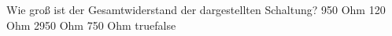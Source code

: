     {Wie groß ist der Gesamtwiderstand der dargestellten Schaltung?}
    {950 Ohm}
    {120 Ohm}
    {2950 Ohm}
    {750 Ohm}
    {true}{false}